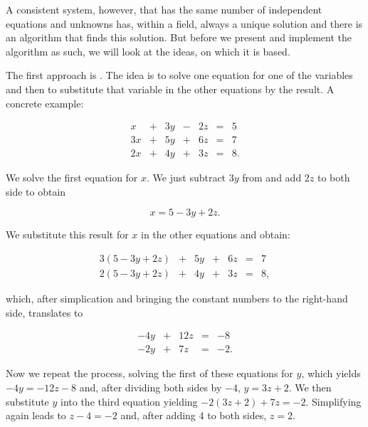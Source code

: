 \documentclass[tikz]{scrreprt}
\begin{document}
A consistent system, however, that has the same number
of independent equations and unknowns has,
within a field, always a unique
solution and there is an algorithm that finds
this solution.
But before we present and implement the algorithm as such,
we will look at the ideas, on which it is based.

The first approach is . The idea is
to solve one equation for one of the variables and then
to substitute that variable in the other equations by
the result. A concrete example:

\begin{equation}
\begin{array}{rcrcrcr}
 x & + & 3y & - & 2z & = &  5\\
3x & + & 5y & + & 6z & = &  7\\
2x & + & 4y & + & 3z & = &  8.
\end{array}
\end{equation}

We solve the first equation for $x$.
We just subtract $3y$ from and add $2z$ to both side
to obtain

\begin{equation}
x = 5 - 3y + 2z.
\end{equation}

We substitute this result for $x$ in the other equations
and obtain:

\begin{equation}
\begin{array}{rcrcrcr}
3(5-3y+2z) & + & 5y & + & 6z & = &  7\\
2(5-3y+2z) & + & 4y & + & 3z & = &  8,
\end{array}
\end{equation}

which, after simplication and bringing the constant
numbers to the right-hand side, translates to

\begin{equation}
\begin{array}{rcrcr}
-4y & + & 12z & = & -8\\
-2y & + & 7z & = &  -2.
\end{array}
\end{equation}

Now we repeat the process, solving the first of these equations
for $y$, which yields $-4y = -12z-8$ and, after dividing
both sides by $-4$, $y=3z+2$. We then substitute $y$
into the third equation yielding $-2(3z+2) + 7z = -2$.
Simplifying again leads to $z-4=-2$ and, after adding 4 to both sides,
$z=2$.
\end{document}
